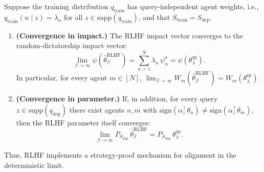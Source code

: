 

\begin{theorem}\label{thm:rlhf-sp-convergence-v2}
    Suppose the training distribution $q_{\mathrm{train}}$ has query-independent 
    agent weights, i.e., $q_{\mathrm{train}}(n \mid z) = \lambda_n$ for all 
    $z \in \mathrm{supp}(q_{\mathrm{train}})$, and that 
    $S_{\mathrm{train}} = S_{\mathrm{dep}}$.
    \begin{enumerate}
        \item \textbf{(Convergence in impact.)} The RLHF impact vector 
        converges to the random-dictatorship impact vector:
        \begin{equation}
            \lim_{\beta \to \infty} 
            \psi\!\left(\hat{\theta}^{\mathrm{RLHF}}_\beta\right)
            = \sum_{n=1}^N \lambda_n \, \psi_n^\star
            = \psi\!\left(\theta^{\mathrm{sp}}_\lambda\right).
        \end{equation}
        In particular, for every agent $m \in [N]$,
        $\lim_{\beta \to \infty} W_m(\hat{\theta}^{\mathrm{RLHF}}_\beta) 
        = W_m(\theta^{\mathrm{sp}}_\lambda)$.

        \item \textbf{(Convergence in parameter.)} If, in addition, for 
        every query $z \in \mathrm{supp}(q_{\mathrm{dep}})$ there exist agents 
        $n, m$ with $\mathrm{sign}(\alpha_z^\top \theta_n) 
        \neq \mathrm{sign}(\alpha_z^\top \theta_m)$, 
        then the RLHF parameter itself converges:
        \begin{equation}
            \lim_{\beta \to \infty} 
            P_{S_{\mathrm{dep}}}\,\hat{\theta}^{\mathrm{RLHF}}_\beta 
            = P_{S_{\mathrm{dep}}}\,\theta^{\mathrm{sp}}_\lambda.
        \end{equation}
    \end{enumerate}
    Thus, RLHF implements a strategy-proof mechanism for alignment 
    in the deterministic limit.
\end{theorem}


